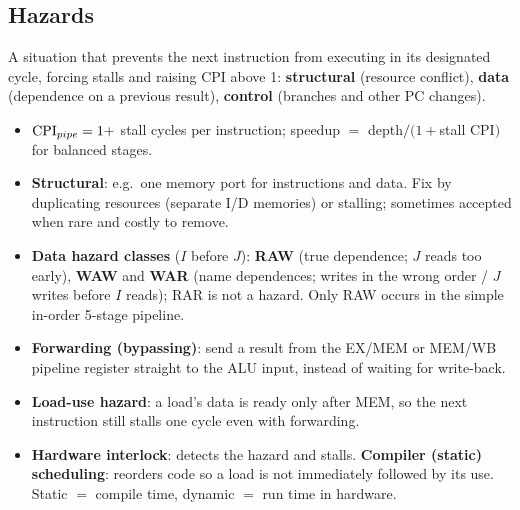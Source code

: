 \documentclass[11pt]{article}
\begin{document}
\subsection{Hazards}
\begin{definition}[Hazard]
A situation that prevents the next instruction from executing in its
designated cycle, forcing stalls and raising CPI above 1:
\textbf{structural} (resource conflict), \textbf{data} (dependence on a
previous result), \textbf{control} (branches and other PC changes).
\end{definition}
\begin{itemize}[leftmargin=*]
  \item $\mathrm{CPI}_{pipe} = 1 + $ stall cycles per instruction; speedup $=$
  depth$/(1+$stall CPI$)$ for balanced stages.
  \item \textbf{Structural}: e.g.\ one memory port for instructions and
  data. Fix by duplicating resources (separate I/D memories) or stalling;
  sometimes accepted when rare and costly to remove.
  \item \textbf{Data hazard classes} ($I$ before $J$): \textbf{RAW} (true
  dependence; $J$ reads too early), \textbf{WAW} and \textbf{WAR} (name
  dependences; writes in the wrong order / $J$ writes before $I$ reads);
  RAR is not a hazard. Only RAW occurs in the simple in-order 5-stage
  pipeline.
  \item \textbf{Forwarding (bypassing)}: send a result from the EX/MEM or
  MEM/WB pipeline register straight to the ALU input, instead of waiting for
  write-back.
  \item \textbf{Load-use hazard}: a load's data is ready only after MEM, so
  the next instruction still stalls one cycle even with forwarding.
  \item \textbf{Hardware interlock}: detects the hazard and stalls.
  \textbf{Compiler (static) scheduling}: reorders code so a load is not
  immediately followed by its use. Static $=$ compile time, dynamic $=$ run
  time in hardware.
\end{itemize}
\end{document}
